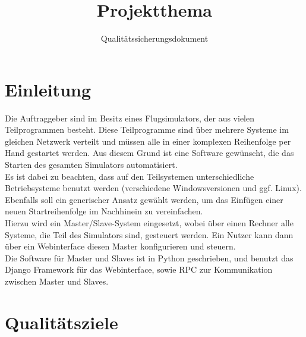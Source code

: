 \documentclass[accentcolor=tud9c,12pt,paper=a4]{tudreport}
\title{Projektthema}
\subtitle{Qualitätssicherungsdokument}
\begin{document}
	\maketitle
	\tableofcontents

	\chapter{Einleitung}
		Die Auftraggeber sind im Besitz eines Flugsimulators, der aus vielen 
		Teilprogrammen besteht. Diese Teilprogramme sind über mehrere Systeme im
		gleichen Netzwerk verteilt und müssen alle in einer komplexen Reihenfolge per Hand 
		gestartet werden. Aus diesem Grund ist eine Software gewünscht, die das Starten des gesamten
		Simulators automatisiert.\\[5pt]
		Es ist dabei zu beachten, dass auf den Teilsystemen unterschiedliche 
		Betriebsysteme benutzt werden (verschiedene Windowsversionen und ggf. Linux). Ebenfalls 
		soll ein generischer Ansatz gewählt werden, um das Einfügen einer neuen Startreihenfolge im Nachhinein zu vereinfachen.\\[5pt]
		Hierzu wird ein Master/Slave-System eingesetzt, wobei über einen Rechner alle 
		Systeme, die Teil des Simulators sind, gesteuert werden. Ein Nutzer kann dann über
		ein Webinterface diesen Master konfigurieren und steuern.\\[5pt]
		Die Software für Master und Slaves ist in Python geschrieben, und benutzt
		das Django Framework für das Webinterface, sowie RPC zur Kommunikation zwischen 
		Master und Slaves.
		

	\chapter{Qualitätsziele}
\end{document}

